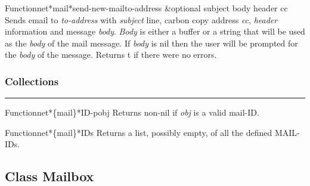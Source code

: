 \begin{functiondoc}{Function}{net*mail*send-new-mail}{to-address \&optional subject body header cc}
Sends email to {\em to-address} with {\em subject} line, carbon copy address {\em cc}, {\em header} 
information and message {\em body}.  {\em Body} is either a buffer or a string that will 
be used as the {\em body} of the mail message. If {\em body} is nil then the user will be 
prompted for the {\em body} of the message. Returns t if there were no errors.
\end{functiondoc}


\subsubsection*{Collections}
\par\vspace*{0.00in}\par\hrule\par\medskip\par


\begin{functiondoc}{Function}{net*\{mail\}*ID-p}{obj}
Returns non-nil if {\em obj} is a valid mail-ID.
\end{functiondoc}

\begin{functiondoc}{Function}{net*\{mail\}*IDs}{}
Returns a list, possibly empty, of all the defined MAIL-IDs.
\end{functiondoc}


\clearpage

\subsection{Class Mailbox}


